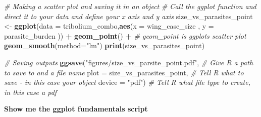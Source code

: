 \documentclass[
]{book}
\newenvironment{Shaded}{\begin{snugshade}}{\end{snugshade}}
\newcommand{\AttributeTok}[1]{\textcolor[rgb]{0.13,0.29,0.53}{#1}}
\newcommand{\CommentTok}[1]{\textcolor[rgb]{0.56,0.35,0.01}{\textit{#1}}}
\newcommand{\FunctionTok}[1]{\textcolor[rgb]{0.13,0.29,0.53}{\textbf{#1}}}
\newcommand{\NormalTok}[1]{#1}
\newcommand{\OtherTok}[1]{\textcolor[rgb]{0.56,0.35,0.01}{#1}}
\newcommand{\SpecialCharTok}[1]{\textcolor[rgb]{0.81,0.36,0.00}{\textbf{#1}}}
\newcommand{\StringTok}[1]{\textcolor[rgb]{0.31,0.60,0.02}{#1}}
\begin{document}
\begin{Shaded}
\begin{Highlighting}[]
\CommentTok{\# Making a scatter plot and saving it in an object}
\CommentTok{\# Call the ggplot function and direct it to your data and define your x axis and y axis}
\NormalTok{size\_vs\_parasites\_point }\OtherTok{\textless{}{-}} \FunctionTok{ggplot}\NormalTok{(}\AttributeTok{data =}\NormalTok{ tribolium\_combo,}\FunctionTok{aes}\NormalTok{(}\AttributeTok{x =}\NormalTok{ wing\_case\_size , }\AttributeTok{y =}\NormalTok{ parasite\_burden )) }\SpecialCharTok{+} 
  \FunctionTok{geom\_point}\NormalTok{() }\SpecialCharTok{+} \CommentTok{\# geom\_point is ggplots scatter plot}
  \FunctionTok{geom\_smooth}\NormalTok{(}\AttributeTok{method=}\StringTok{"lm"}\NormalTok{)}
\FunctionTok{print}\NormalTok{(size\_vs\_parasites\_point)}

\CommentTok{\# Saving outputs}
\FunctionTok{ggsave}\NormalTok{(}\StringTok{"figures/size\_vs\_parsite\_point.pdf"}\NormalTok{, }\CommentTok{\# Give R a path to save to and a file name}
       \AttributeTok{plot =}\NormalTok{ size\_vs\_parasites\_point, }\CommentTok{\# Tell R what to save {-} in this case your object}
       \AttributeTok{device =} \StringTok{"pdf"}\NormalTok{) }\CommentTok{\# Tell R what file type to create, in this case a pdf}
\end{Highlighting}
\end{Shaded}

\textbf{Show me the ggplot fundamentals script}
\end{document}

